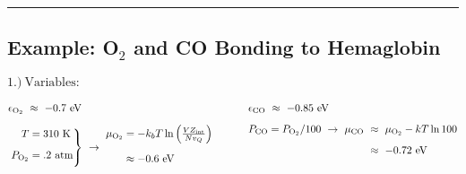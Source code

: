 \documentclass[12pt]{article}
\begin{document}
\vspace{10pt}\noindent
\rule{1\textwidth}{.5pt}

\subsection{Example: O\(_2\) and CO Bonding to Hemaglobin}
\vspace{5pt}
\(1.)\ \text{Variables}:\)

\vspace{5pt}
\(\begin{aligned}[t]
    &\epsilon_{\text{O}_2} \ \approx \ -0.7 \ \text{eV}\\[5pt]
    &\left.\begin{aligned}
            T &= 310 \ \text{K}\\[5pt]
            P_{\text{O}_2} &= .2 \ \text{atm} \\[5pt]
        \end{aligned}\right\}
        \ \rightarrow \ \begin{aligned}
            \mu_{\text{O}_2} &= -k_b T \ln{\left( \tfrac{V Z_\text{int}}{N v_Q} \right)}\\[5pt]
            &\approx -0.6 \ \text{eV}\\[5pt]
        \end{aligned}
\end{aligned}
\hspace{1.2cm}
\begin{aligned}[t]
    &\epsilon_{\text{CO}} \ \approx \ -0.85 \ \text{eV}\\[5pt]
    &P_{\text{CO}} = P_{\text{O}_2} / 100 
        \ \rightarrow \ \begin{aligned}[t]
            \mu_{\text{CO}} \ &\approx\  \mu_{\text{O}_2} - kT \ln{100} \\[5pt]
            &\approx \ -0.72 \ \text{eV}
        \end{aligned}
\end{aligned}\)
\end{document}
